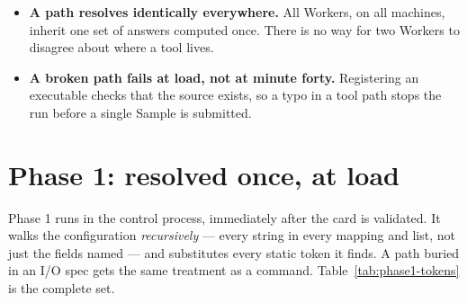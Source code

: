 \begin{itemize}
  \item \textbf{A path resolves identically everywhere.} All Workers, on all machines,
        inherit one set of answers computed once. There is no way for two Workers to
        disagree about where a tool lives.
  \item \textbf{A broken path fails at load, not at minute forty.} Registering an
        executable checks that the source exists, so a typo in a tool path stops the run
        before a single Sample is submitted.
\end{itemize}

\section{Phase 1: resolved once, at load}
\label{sec:phase1}

Phase 1 runs in the control process, immediately after the card is validated. It walks
the configuration \emph{recursively} --- every string in every mapping and list, not just
the fields named  --- and substitutes every static token it finds. A path
buried in an I/O spec gets the same treatment as a command.
Table~\ref{tab:phase1-tokens} is the complete set.

